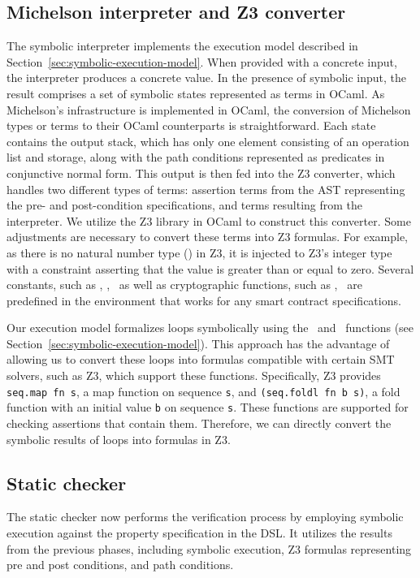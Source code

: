 \documentclass[a4paper,USenglish,cleveref, autoref, thm-restate]{lipics-v2021}
\begin{document}
\subsection{Michelson interpreter and Z3 converter}
\label{sec:mich-interpr-z3}
The symbolic interpreter implements the execution model described in
Section~\ref{sec:symbolic-execution-model}. When provided with a
concrete input, the interpreter produces a concrete value. In the
presence of symbolic input, the result comprises a set of symbolic
states represented as terms in OCaml. As Michelson's infrastructure is
implemented in OCaml, the conversion of Michelson types or terms to
their OCaml counterparts is straightforward. Each state contains the
output stack, which has only one element consisting of an operation
list and storage, along with the path conditions represented as
predicates in conjunctive normal form. This output is then fed into
the Z3 converter, which handles two different types of terms:
assertion terms from the AST representing the pre- and post-condition
specifications, and terms resulting from the interpreter. We utilize
the Z3 library in OCaml to construct this converter. Some adjustments
are necessary to convert these terms into Z3 formulas. For example, as
there is no natural number type (\TNAT) in Z3, it is injected to Z3's
integer type with a constraint asserting that the value is greater
than or equal to zero. Several constants, such as \CAMOUNT, \CBALANCE,
\CSENDER\ as well as cryptographic functions, such as \FSHA,
\FHASHKEY\ are predefined in the environment that works for any smart
contract specifications. 

Our execution model formalizes loops symbolically using the \FOLD\ and
\FMAP\ functions (see
Section~\ref{sec:symbolic-execution-model}). This approach has the
advantage of allowing us to convert these loops into formulas
compatible with certain SMT solvers, such as Z3, which support these
functions. Specifically, Z3 provides \lstinline/seq.map fn s/, a map
function on sequence \lstinline/s/, and
\lstinline/(seq.foldl fn b s)/, a fold function with an initial value \lstinline/b/ on sequence
\lstinline/s/. These functions are supported for checking assertions
that contain them. Therefore, we can directly convert the symbolic
results of loops into formulas in Z3. 
\subsection{Static checker}
\label{sec:static-checker}
The static checker now performs the verification process by employing symbolic execution against the property specification in the DSL. It utilizes the results from the previous phases, including symbolic execution, Z3 formulas representing pre and post conditions, and path conditions. 
\end{document}
